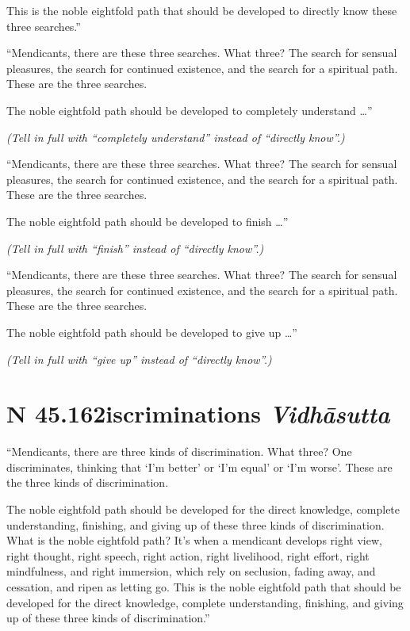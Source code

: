 \documentclass[12pt,openany]{book}%
\newcommand*{\suttatitleacronym}[1]{\smaller[2]{#1}\vspace*{.3em}}
\newcommand*{\suttatitletranslation}[1]{\linebreak{#1}}
\newcommand*{\suttatitleroot}[1]{\linebreak\smaller[2]\itshape{#1}}
\newcommand*{\tocacronym}[1]{\hspace*{-3.3em}{#1}\quad}
\newcommand*{\toctranslation}[1]{#1}
\newcommand*{\tocroot}[1]{(\textit{#1})}
\newcommand*{\scexpansioninstructions}[1]{\begin{small}\textit{#1}\end{small}}
\begin{document}
This is the noble eightfold path that should be developed to directly know these three searches.” 

“Mendicants, there are these three searches. What three? The search for sensual pleasures, the search for continued existence, and the search for a spiritual path. These are the three searches. 

The noble eightfold path should be developed to completely understand …” 

\scexpansioninstructions{(Tell in full with “completely understand” instead of “directly know”.) }

“Mendicants, there are these three searches. What three? The search for sensual pleasures, the search for continued existence, and the search for a spiritual path. These are the three searches. 

The noble eightfold path should be developed to finish …” 

\scexpansioninstructions{(Tell in full with “finish” instead of “directly know”.) }

“Mendicants, there are these three searches. What three? The search for sensual pleasures, the search for continued existence, and the search for a spiritual path. These are the three searches. 

The noble eightfold path should be developed to give up …” 

\scexpansioninstructions{(Tell in full with “give up” instead of “directly know”.) }

%
\section*{{\suttatitleacronym SN 45.162}{\suttatitletranslation Discriminations }{\suttatitleroot Vidhāsutta}}
\addcontentsline{toc}{section}{\tocacronym{SN 45.162} \toctranslation{Discriminations } \tocroot{Vidhāsutta}}

“Mendicants, there are three kinds of discrimination. What three? One discriminates, thinking that ‘I’m better’ or ‘I’m equal’ or ‘I’m worse’. These are the three kinds of discrimination. 

The noble eightfold path should be developed for the direct knowledge, complete understanding, finishing, and giving up of these three kinds of discrimination. What is the noble eightfold path? It’s when a mendicant develops right view, right thought, right speech, right action, right livelihood, right effort, right mindfulness, and right immersion, which rely on seclusion, fading away, and cessation, and ripen as letting go. This is the noble eightfold path that should be developed for the direct knowledge, complete understanding, finishing, and giving up of these three kinds of discrimination.” 
\end{document}
